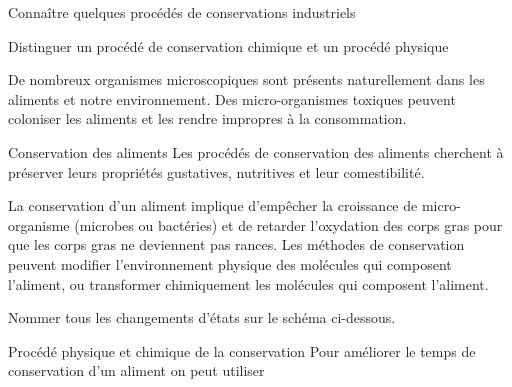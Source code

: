 \teteTermStssAlim
\vspace*{-30pt}

\begin{objectifs}
  \item Connaître quelques procédés de conservations industriels
  \item Distinguer un procédé de conservation chimique et un procédé physique
\end{objectifs}

\begin{contexte}
  De nombreux organismes microscopiques sont présents naturellement dans les aliments et notre environnement.
  Des micro-organismes toxiques peuvent coloniser les aliments et les rendre impropres à la consommation.

\end{contexte}


\begin{doc}{Conservation des aliments}
  Les procédés de conservation des aliments cherchent à préserver leurs propriétés gustatives, nutritives et leur comestibilité.

  La conservation d'un aliment implique d'empêcher la croissance de micro-organisme (microbes ou bactéries) et de retarder l'oxydation des corps gras pour que les corps gras ne deviennent pas rances.
  Les méthodes de conservation peuvent modifier l'environnement physique des molécules qui composent l'aliment, ou transformer chimiquement les molécules qui composent l'aliment.
\end{doc}

\schematiser Nommer tous les changements d'états sur le schéma ci-dessous.

\begin{center}
\end{center}


\begin{doc}{Procédé physique et chimique de la conservation}
  Pour améliorer le temps de conservation d'un aliment on peut utiliser
  \begin{importants}
  \end{importants}
\end{doc}


